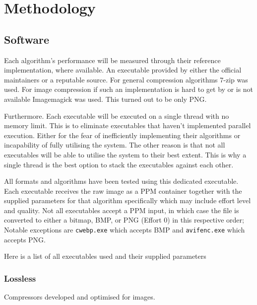 \documentclass[11pt,a4paper]{report}
\begin{document}
\section{Methodology}

\subsection{Software}

Each algorithm's performance will be measured through their reference implementation, where available. An executable provided by either the official maintainers or a reputable source. For general compression algorithms 7-zip was used. For image compression if such an implementation is hard to get by or is not available Imagemagick \cite{imagemagick} was used. This turned out to be only PNG.

Furthermore. Each executable will be executed on a single thread with no memory limit. This is to eliminate executables that haven't implemented parallel execution. Either for the fear of inefficiently implementing their algorithms or incapability of fully utilising the system. The other reason is that not all executables will be able to utilise the system to their best extent. This is why a single thread is the best option to stack the executables against each other. 

All formats and algorithms have been tested using this dedicated executable. Each executable receives the raw image as a PPM container together with the supplied parameters for that algorithm specifically which may include effort level and quality. Not all executables accept a PPM input, in which case the file is converted to either a bitmap, BMP, or PNG (Effort 0) in this respective order; Notable exceptions are \verb|cwebp.exe| which accepts BMP and \verb|avifenc.exe| which accepts PNG.

Here is a list of all executables used and their supplied parameters

\lstset{style=cmdstyle}

\subsubsection{Lossless}

Compressors developed and optimised for images.
\end{document}

